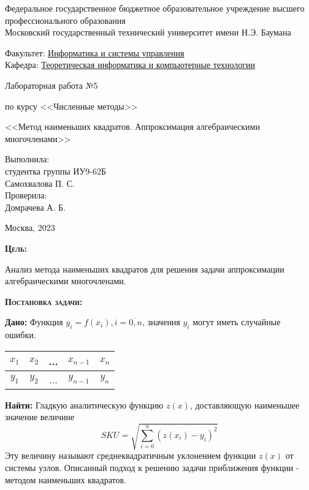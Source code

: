 \documentclass [12pt]{article}
\title{}
\date{}
\author{}
\begin{document}
\begin{titlepage}
\thispagestyle{empty}
\begin{center}
Федеральное государственное бюджетное образовательное учреждение высшего профессионального образования \\Московский государственный технический университет имени Н.Э. Баумана

\end{center}
\bigskip
\begin{flushleft}
Факультет: \underline{Информатика и системы управления}\\
Кафедра: \underline{Теоретическая информатика и компьютерные технологии}
\end{flushleft}
\vfill
\centerline{\large{Лабораторная работа №5}}
\centerline{\large{по курсу <<Численные методы>>}}
\centerline{\large{<<Метод наименьших квадратов. Аппроксимация алгебраическими многочленами>>}}
\vfill
\hfill\parbox{5cm} {
           Выполнила:\\
           студентка группы ИУ9-62Б \hfill \\
           Самохвалова П. С.\hfill \medskip\\
           Проверила:\\
           Домрачева А. Б.\hfill
       }
\centerline{Москва, 2023}
\clearpage
\end{titlepage}

\textsc{\textbf{Цель:}}

Анализ метода наименьших квадратов для решения задачи аппроксимации алгебраическими многочленами.

\textsc{\textbf{Постановка задачи:}}

\textbf{Дано:}  Функция $y_i = f(x_i),  i = \overline{0,n}$, значения $y_i$ могут иметь случайные ошибки.

\begin{table}[h]
\begin{center}
\begin{tabular}{|c|c|c|c|c|}
\hline
$x_1$ & $x_2$ & ... & $x_{n-1}$ & $x_n$ \\
\hline
$y_1$ & $y_2$ & ... & $y_{n-1}$ & $y_n$ \\
\hline
\end{tabular}
\end{center}
\end{table}

\textbf{Найти:} Гладкую аналитическую функцию  $z(x)$, доставляющую наименьшее значение величине $$ SKU=\sqrt{\sum\limits_{i = 0}^n{(z(x_i) - y_i)^2}}$$ Эту величину называют среднеквадратичным уклонением функции $z(x)$ от системы узлов. Описанный подход к решению задачи приближения функции - методом наименьших квадратов.
\end{document}
